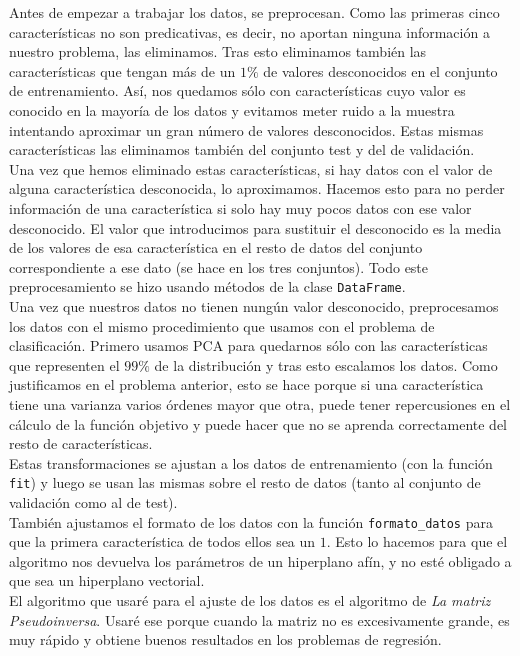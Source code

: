 \documentclass{article}
\begin{document}
Antes de empezar a trabajar los datos, se preprocesan. Como las primeras cinco características no son predicativas, es decir, no aportan ninguna información a nuestro problema, las eliminamos. Tras esto eliminamos también las características que tengan más de un $1\%$ de valores desconocidos en el conjunto de entrenamiento. Así, nos quedamos sólo con características cuyo valor es conocido en la mayoría de los datos y evitamos meter ruido a la muestra intentando aproximar un gran número de valores desconocidos. Estas mismas características las eliminamos también del conjunto test y del de validación.\\
Una vez que hemos eliminado estas características, si hay datos con el valor de alguna característica desconocida, lo aproximamos. Hacemos esto para no perder información de una característica si solo hay muy pocos datos con ese valor desconocido. El valor que introducimos para sustituir el desconocido es la media de los valores de esa característica en el resto de datos del conjunto correspondiente a ese dato (se hace en los tres conjuntos). Todo este preprocesamiento se hizo usando métodos de la clase \texttt{DataFrame}.\\

Una vez que nuestros datos no tienen nungún valor desconocido, preprocesamos los datos con el mismo procedimiento que usamos con el problema de clasificación. Primero usamos PCA para quedarnos sólo con las características que representen el $99\%$ de la distribución y tras esto escalamos los datos. Como justificamos en el problema anterior, esto se hace porque si una característica tiene una varianza varios órdenes mayor que otra, puede tener repercusiones en el cálculo de la función objetivo y puede hacer que no se aprenda correctamente del resto de características.\\
Estas transformaciones se ajustan a los datos de entrenamiento (con la función \texttt{fit}) y luego se usan las mismas sobre el resto de datos (tanto al conjunto de validación como al de test).\\
También ajustamos el formato de los datos con la función \texttt{formato\_datos} para que la primera característica de todos ellos sea un $1$. Esto lo hacemos para que el algoritmo nos devuelva los parámetros de un hiperplano afín, y no esté obligado a que sea un hiperplano vectorial.\\

El algoritmo que usaré para el ajuste de los datos es el algoritmo de \textit{La matriz Pseudoinversa}. Usaré ese porque cuando la matriz no es excesivamente grande, es muy rápido y obtiene buenos resultados en los problemas de regresión.\\
\end{document}
